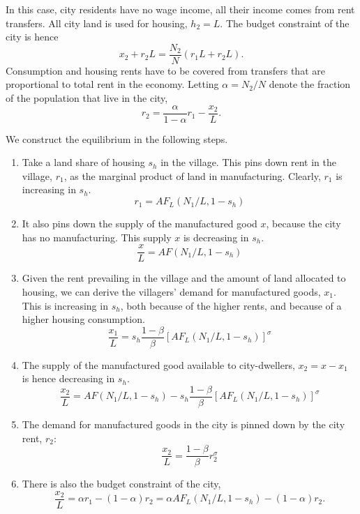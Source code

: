 \documentclass[12pt]{article}
\begin{document}
In this case, city residents have no wage income, all their income comes from rent transfers. All city land is used for housing, $h_2=L$. The budget constraint of the city is hence
\[
x_2+r_2L = \frac{N_2}{N}(r_1L+r_2L).
\]
Consumption and housing rents have to be covered from transfers that are proportional to total rent in the economy. Letting $\alpha=N_2/N$ denote the fraction of the population that live in the city,
\[
r_2 = \frac{\alpha}{1-\alpha}r_1 -\frac{x_2}{L}.
\]

We construct the equilibrium in the following steps.
\begin{enumerate}
  \item Take a land share of housing $s_h$ in the village. This pins down rent in the village, $r_1$, as the marginal product of land in manufacturing. Clearly, $r_1$ is increasing in $s_h$.
      \[
      r_1 = AF_L(N_1/L,1-s_h)
      \]
  \item It also pins down the supply of the manufactured good $x$, because the city has no manufacturing. This supply $x$ is decreasing in $s_h$.
      \[
      \frac{x}{L} = AF(N_1/L,1-s_h)
      \]
  \item Given the rent prevailing in the village and the amount of land allocated to housing, we can derive the villagers' demand for manufactured goods, $x_1$. This is increasing in $s_h$, both because of the higher rents, and because of a higher housing consumption.
      \[
      \frac{x_1}{L} = s_h\frac{1-\beta}{\beta}\left[AF_L(N_1/L,1-s_h)\right]^\sigma
      \]
  \item The supply of the manufactured good available to city-dwellers, $x_2=x-x_1$ is hence decreasing in $s_h$.
      \begin{equation}\label{eq:eq1}
      \frac{x_2}{L} = AF(N_1/L,1-s_h)-s_h\frac{1-\beta}{\beta}\left[AF_L(N_1/L,1-s_h)\right]^\sigma
      \end{equation}
  \item The demand for manufactured goods in the city is pinned down by the city rent, $r_2$:
      \begin{equation}\label{eq:eq2}
      \frac{x_2}{L} = \frac{1-\beta}{\beta}r_2^\sigma
      \end{equation}
  \item There is also the budget constraint of the city,
  \begin{equation}\label{eq:eq3}
    \frac{x_2}{L} = \alpha r_1 -(1-\alpha)r_2 = \alpha AF_L(N_1/L,1-s_h) -(1-\alpha)r_2.
  \end{equation}
  
\end{enumerate}
\end{document}
